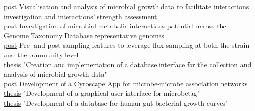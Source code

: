 \documentclass[
    a4paper,
]{fortysecondscv}
\begin{document}
\begin{cvtable}


    {\href{}{post}}
    {Visualisation and analysis of microbial growth data to facilitate interactions investigation and interactions' strength assessment}{}\\


    {\href{}{post}}
    {Investigation of microbial metabolic interactions potential across the Genome Taxonomy Database representative genomes
    }{}\\


    {\href{https://sotiristouliopoulos.github.io/dingo/}{post}}
    {Pre- and post-sampling features to leverage flux sampling at both the strain and the community level}{}\\

    {\href{}{thesis}}
    {"Creation and implementation of a database interface for the collection and analysis of microbial growth data"}{}\\

    {\href{https://ermismd.github.io/MGG/}{post}}
    {Development of a Cytoscape App for microbe-microbe association networks
    }{}\\

    {\href{}{thesis}}
    {"Development of a graphical user interface for microbetag"
    }\\

    {\href{https://kuleuven.limo.libis.be/discovery/fulldisplay?docid=alma9993527122501488&context=L&vid=32KUL_KUL:KULeuven&search_scope=All_Content&tab=all_content_tab&lang=en}{thesis}}
    {"Development of a database for human gut bacterial growth curves"
    }\\


\end{cvtable}
\end{document}
